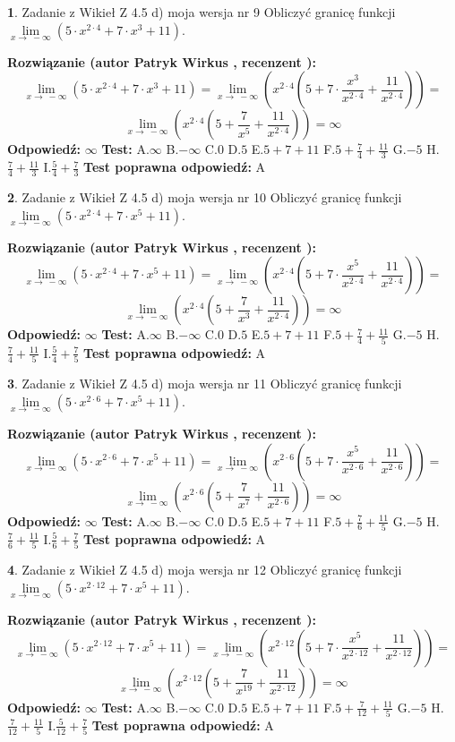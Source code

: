 \documentclass[12pt, a4paper]{article}
\theoremstyle{definition} %
\newtheorem{zad}{}
\newcommand{\zadStart}[1]{\begin{zad}#1\newline}
\newcommand{\zadStop}{\end{zad}}
\newcommand{\rozwStart}[2]{\noindent \textbf{Rozwiązanie (autor #1 , recenzent #2): }\newline}
\newcommand{\rozwStop}{\newline}
\newcommand{\odpStart}{\noindent \textbf{Odpowiedź:}\newline}
\newcommand{\odpStop}{\newline}
\newcommand{\testStart}{\noindent \textbf{Test:}\newline}
\newcommand{\testStop}{\newline}
\newcommand{\kluczStart}{\noindent \textbf{Test poprawna odpowiedź:}\newline}
\newcommand{\kluczStop}{\newline}
\begin{document}
\zadStart{Zadanie z Wikieł Z 4.5 d) moja wersja nr 9}
Obliczyć granicę funkcji  $\lim\limits_{x\to\ -\infty}(5 \cdot x^{2\cdot4}+7 \cdot x^{3}+11)$.
\zadStop
\rozwStart{Patryk Wirkus}{}
$$\lim\limits_{x\to\ -\infty}(5 \cdot x^{2\cdot4}+7 \cdot x^{3}+11) = \lim\limits_{x\to\ -\infty}(x^{2\cdot4}(5 +7 \cdot \frac{x^{3}}{x^{2\cdot4}}+\frac{11}{x^{2\cdot4}})) =$$ $$\lim\limits_{x\to\ -\infty}(x^{2\cdot4}(5 +\frac{7}{x^{5}}+\frac{11}{x^{2\cdot4}})) =\infty$$
\rozwStop
\odpStart
$\infty$
\odpStop
\testStart
A.$\infty$ B.$-\infty$ C.$0$ D.$5$ E.$5 + 7 + 11$
F.$5+\frac{7}{4}+\frac{11}{3}$ G.$-5$
H.$\frac{7}{4}+\frac{11}{3}$
I.$\frac{5}{4}+\frac{7}{3}$
\testStop
\kluczStart
A
\kluczStop



\zadStart{Zadanie z Wikieł Z 4.5 d) moja wersja nr 10}
Obliczyć granicę funkcji  $\lim\limits_{x\to\ -\infty}(5 \cdot x^{2\cdot4}+7 \cdot x^{5}+11)$.
\zadStop
\rozwStart{Patryk Wirkus}{}
$$\lim\limits_{x\to\ -\infty}(5 \cdot x^{2\cdot4}+7 \cdot x^{5}+11) = \lim\limits_{x\to\ -\infty}(x^{2\cdot4}(5 +7 \cdot \frac{x^{5}}{x^{2\cdot4}}+\frac{11}{x^{2\cdot4}})) =$$ $$\lim\limits_{x\to\ -\infty}(x^{2\cdot4}(5 +\frac{7}{x^{3}}+\frac{11}{x^{2\cdot4}})) =\infty$$
\rozwStop
\odpStart
$\infty$
\odpStop
\testStart
A.$\infty$ B.$-\infty$ C.$0$ D.$5$ E.$5 + 7 + 11$
F.$5+\frac{7}{4}+\frac{11}{5}$ G.$-5$
H.$\frac{7}{4}+\frac{11}{5}$
I.$\frac{5}{4}+\frac{7}{5}$
\testStop
\kluczStart
A
\kluczStop



\zadStart{Zadanie z Wikieł Z 4.5 d) moja wersja nr 11}
Obliczyć granicę funkcji  $\lim\limits_{x\to\ -\infty}(5 \cdot x^{2\cdot6}+7 \cdot x^{5}+11)$.
\zadStop
\rozwStart{Patryk Wirkus}{}
$$\lim\limits_{x\to\ -\infty}(5 \cdot x^{2\cdot6}+7 \cdot x^{5}+11) = \lim\limits_{x\to\ -\infty}(x^{2\cdot6}(5 +7 \cdot \frac{x^{5}}{x^{2\cdot6}}+\frac{11}{x^{2\cdot6}})) =$$ $$\lim\limits_{x\to\ -\infty}(x^{2\cdot6}(5 +\frac{7}{x^{7}}+\frac{11}{x^{2\cdot6}})) =\infty$$
\rozwStop
\odpStart
$\infty$
\odpStop
\testStart
A.$\infty$ B.$-\infty$ C.$0$ D.$5$ E.$5 + 7 + 11$
F.$5+\frac{7}{6}+\frac{11}{5}$ G.$-5$
H.$\frac{7}{6}+\frac{11}{5}$
I.$\frac{5}{6}+\frac{7}{5}$
\testStop
\kluczStart
A
\kluczStop



\zadStart{Zadanie z Wikieł Z 4.5 d) moja wersja nr 12}
Obliczyć granicę funkcji  $\lim\limits_{x\to\ -\infty}(5 \cdot x^{2\cdot12}+7 \cdot x^{5}+11)$.
\zadStop
\rozwStart{Patryk Wirkus}{}
$$\lim\limits_{x\to\ -\infty}(5 \cdot x^{2\cdot12}+7 \cdot x^{5}+11) = \lim\limits_{x\to\ -\infty}(x^{2\cdot12}(5 +7 \cdot \frac{x^{5}}{x^{2\cdot12}}+\frac{11}{x^{2\cdot12}})) =$$ $$\lim\limits_{x\to\ -\infty}(x^{2\cdot12}(5 +\frac{7}{x^{19}}+\frac{11}{x^{2\cdot12}})) =\infty$$
\rozwStop
\odpStart
$\infty$
\odpStop
\testStart
A.$\infty$ B.$-\infty$ C.$0$ D.$5$ E.$5 + 7 + 11$
F.$5+\frac{7}{12}+\frac{11}{5}$ G.$-5$
H.$\frac{7}{12}+\frac{11}{5}$
I.$\frac{5}{12}+\frac{7}{5}$
\testStop
\kluczStart
A
\kluczStop
\end{document}
